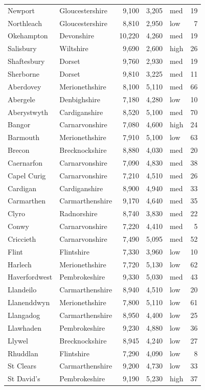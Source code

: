 \documentclass[11pt,a4paper]{article}
\begin{document}
{\begin{longtable}{p{5.4cm}p{4.2cm}rrlr}
Newport & Gloucestershire & 9,100 & 3,205 & med & 19\\
Northleach & Gloucestershire & 8,810 & 2,950 & low & 7\\
Okehampton & Devonshire & 10,220 & 4,260 & med & 19\\
Salisbury & Wiltshire & 9,690 & 2,600 & high & 26\\
Shaftesbury & Dorset & 9,760 & 2,930 & med & 19\\
Sherborne & Dorset & 9,810 & 3,225 & med & 11\\
Aberdovey & Merionethshire & 8,100 & 5,110 & med & 66\\
Abergele & Denbighshire & 7,180 & 4,280 & low & 10\\
Aberystwyth & Cardiganshire & 8,520 & 5,100 & med & 70\\
Bangor & Carnarvonshire & 7,080 & 4,600 & high & 24\\
Barmouth & Merionethshire & 7,910 & 5,100 & low & 63\\
Brecon & Brecknockshire & 8,880 & 4,030 & med & 20\\
Caernarfon & Carnarvonshire & 7,090 & 4,830 & med & 38\\
Capel Curig & Carnarvonshire & 7,210 & 4,510 & med & 26\\
Cardigan & Cardiganshire & 8,900 & 4,940 & med & 33\\
Carmarthen & Carmarthenshire & 9,170 & 4,640 & med & 35\\
Clyro & Radnorshire & 8,740 & 3,830 & med & 22\\
Conwy & Carnarvonshire & 7,220 & 4,410 & med & 5\\
Criccieth & Carnarvonshire & 7,490 & 5,095 & med & 52\\
Flint & Flintshire & 7,330 & 3,960 & low & 10\\
Harlech & Merionethshire & 7,720 & 5,130 & low & 62\\
Haverfordwest & Pembrokeshire & 9,330 & 5,030 & med & 43\\
Llandeilo & Carmarthenshire & 8,940 & 4,510 & low & 20\\
Llanenddwyn & Merionethshire & 7,800 & 5,110 & low & 61\\
Llangadog & Carmarthenshire & 8,950 & 4,400 & low & 25\\
Llawhaden & Pembrokeshire & 9,230 & 4,880 & low & 36\\
Llywel & Brecknockshire & 8,945 & 4,240 & low & 27\\
Rhuddlan & Flintshire & 7,290 & 4,090 & low & 8\\
St Clears & Carmarthenshire & 9,200 & 4,730 & low & 33\\
St David's & Pembrokeshire & 9,190 & 5,230 & high & 37\\
\bottomrule\end{longtable}}
\end{document}
